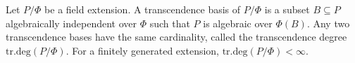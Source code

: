 Let $P/\Phi$ be a field extension. A transcendence basis of $P/\Phi$ is a subset $B \subseteq P$ algebraically independent over $\Phi$ such that $P$ is algebraic over $\Phi(B)$. Any two transcendence bases have the same cardinality, called the transcendence degree $\text{tr.deg}(P/\Phi)$. For a finitely generated extension, $\text{tr.deg}(P/\Phi) < \infty$.

